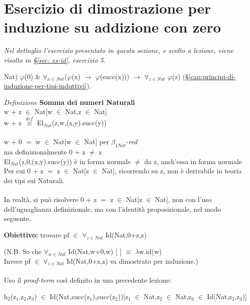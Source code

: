 \section{Esercizio di dimostrazione per induzione su addizione con zero}
\label{sec:esercizio-di-dimostrazione-per-induzione-su-addizione-con-zero}
\textit{Nel dettaglio l'esercizio presentato in questa sezione, e svolto a lezione, viene risolto in \S \ref{sec: es-id}, esercizio 5}.
\noindent
\begin{center}Nat) $\varphi$(0) $\&$ $\forall_{x \in Nat}$($\varphi$(x) $\rightarrow$ $\varphi$(succ(x))) $\rightarrow$ $\forall_{z \in Nat}$ $\varphi$(z) (\S \ref{cap:principi-di-induzione-per-tipi-induttivi}).\end{center}
\noindent
\textit{Definizione} \textbf{Somma dei numeri Naturali}\\
w $+$ z $\in$ Nat[w $\in$ Nat,z $\in$ Nat]\\
w $+$ z ${\overset{\mathit{def}}{\equiv}}$ El$_{Nat}$(z,w,(x,y).succ(y))\\\\ 
\noindent
w $+$ 0 $=$ w $\in$ Nat[w $\in$ Nat] per \textit{$\beta_{1Nat}$-red}\\
ma definizionalmente 0 $+$ z $\neq$ z\\
El$_{Nat}$(z,0,(x,y).succ(y)) \`e in forma normale $\neq$ da z, anch'essa in forma normale\\
Per cui 0 $+$ z $=$ z $\in$ Nat[z $\in$ Nat], ricorrendo su z, non \`e derivabile in teoria dei tipi sui Naturali.\\\\
\noindent 
In realt\`a, si pu\`o risolvere 0 $+$ z $=$ z $\in$ Nat[z $\in$ Nat], non con l'uso dell'uguaglianza definizionale, ma con l'identit\`a proposizionale, nel modo seguente.\\
\begin{center}\textbf{Obiettivo:} trovare pf $\in$ $\forall_{z \in Nat}$ Id(Nat,0$+$z,z)\end{center}
(N.B. So che
$\forall_{w \in Nat}$ Id(Nat,w+0,w) [ ] $\equiv$ $\lambda$w.id(w)\\
Invece pf $\in$ $\forall_{z \in Nat}$ Id(Nat,0$+$z,z) va dimostrato per induzione.)
\noindent
\\\\
Uso il \textit{proof-term} cos\`i definito in una precedente lezione:
\begin{center} h$_2$(z$_1$,z$_2$,z$_3$) $\in$ Id(Nat,succ(z$_1$),succ(z$_2$))[z$_1$ $\in$ Nat,z$_2$ $\in$ Nat,z$_3$ $\in$ Id(Nat,z$_2$,z$_3$)]\end{center}

